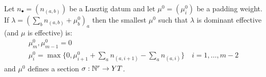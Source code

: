 \documentclass[draft]{article} %
\begin{document}
\begin{lemma}
\label{lem:almostmintab}
Let $n_\bullet = (n_{(a,b)})$ be a Lusztig datum and let $\mu^0 = (\mu^0_i)$ be a padding weight. If $\lambda = (\sum_b n_{(a,b)} + \mu^0_b)_a $ 
then 
    the smallest $\mu^0$ such that $\lambda$ is dominant effective (and $\mu$ is effective) is:
    $$\begin{gathered}
        \mu^0_{m}, \mu^0_{m-1} = 0 \\
        \mu^0_i = \max\{0, \mu_{i+1}^0 + \sum_a n_{(a,i+1)} - \sum_a n_{(a,i)}\} \quad i = 1,\dots,m-2
    \end{gathered}$$
and $\mu^0$ defines a section $\sigma:\mathbb N^{r} \to YT$.
\end{lemma}
\end{document}
